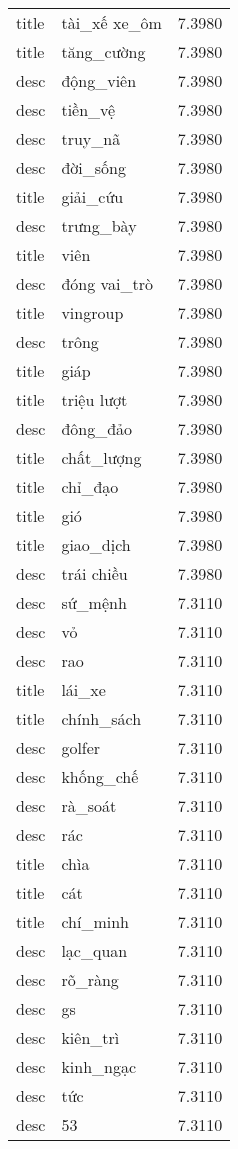\documentclass{article}
\begin{document}
\begin{tabular}{lll}
title & tài\_xế xe\_ôm & 7.3980\\
title & tăng\_cường & 7.3980\\
desc & động\_viên & 7.3980\\
desc & tiền\_vệ & 7.3980\\
desc & truy\_nã & 7.3980\\
desc & đời\_sống & 7.3980\\
title & giải\_cứu & 7.3980\\
desc & trưng\_bày & 7.3980\\
title & viên & 7.3980\\
desc & đóng vai\_trò & 7.3980\\
title & vingroup & 7.3980\\
desc & trông & 7.3980\\
title & giáp & 7.3980\\
title & triệu lượt & 7.3980\\
desc & đông\_đảo & 7.3980\\
title & chất\_lượng & 7.3980\\
title & chỉ\_đạo & 7.3980\\
title & gió & 7.3980\\
title & giao\_dịch & 7.3980\\
desc & trái chiều & 7.3980\\
desc & sứ\_mệnh & 7.3110\\
desc & vỏ & 7.3110\\
desc & rao & 7.3110\\
title & lái\_xe & 7.3110\\
title & chính\_sách & 7.3110\\
desc & golfer & 7.3110\\
desc & khống\_chế & 7.3110\\
desc & rà\_soát & 7.3110\\
desc & rác & 7.3110\\
title & chìa & 7.3110\\
title & cát & 7.3110\\
title & chí\_minh & 7.3110\\
desc & lạc\_quan & 7.3110\\
desc & rõ\_ràng & 7.3110\\
desc & gs & 7.3110\\
desc & kiên\_trì & 7.3110\\
desc & kinh\_ngạc & 7.3110\\
desc & tức & 7.3110\\
desc & 53 & 7.3110\\

\end{tabular}
\end{document}
